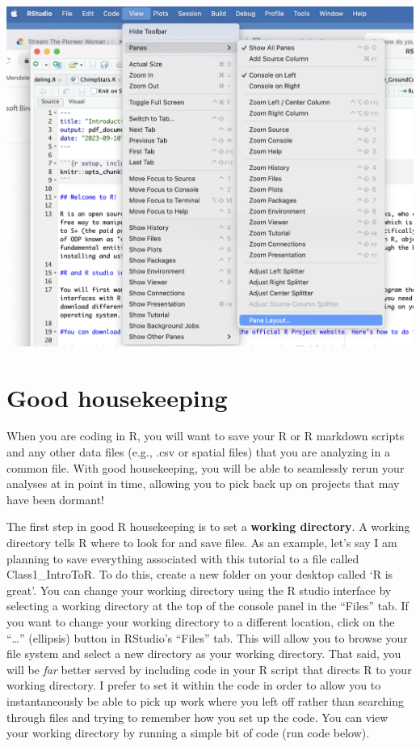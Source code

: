 \documentclass[
]{book}
\begin{document}
\includegraphics{images/01-intro/PaneLayout.png}

\hypertarget{good-housekeeping}{%
\section{Good housekeeping}\label{good-housekeeping}}

When you are coding in R, you will want to save your R or R markdown scripts and any other data files (e.g., .csv or spatial files) that you are analyzing in a common file. With good housekeeping, you will be able to seamlessly rerun your analyses at in point in time, allowing you to pick back up on projects that may have been dormant!

The first step in good R housekeeping is to set a \textbf{working directory}. A working directory tells R where to look for and save files. As an example, let's say I am planning to save everything associated with this tutorial to a file called Class1\_IntroToR. To do this, create a new folder on your desktop called `R is great'. You can change your working directory using the R studio interface by selecting a working directory at the top of the console panel in the ``Files'' tab. If you want to change your working directory to a different location, click on the ``\ldots{}'' (ellipsis) button in RStudio's ``Files'' tab. This will allow you to browse your file system and select a new directory as your working directory. That said, you will be \emph{far} better served by including code in your R script that directs R to your working directory. I prefer to set it within the code in order to allow you to instantaneously be able to pick up work where you left off rather than searching through files and trying to remember how you set up the code. You can view your working directory by running a simple bit of code (run code below).
\end{document}
